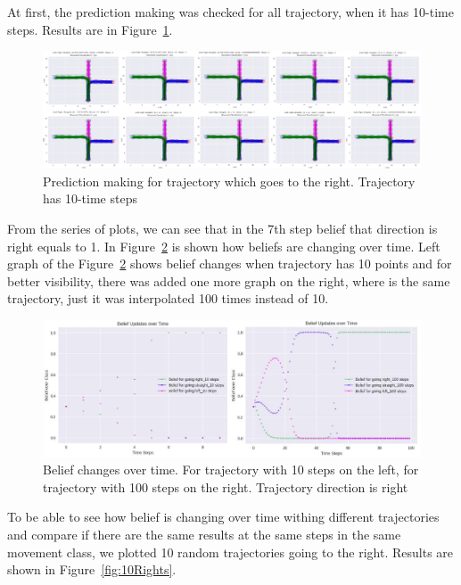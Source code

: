 At first, the prediction making was checked for all trajectory, when it has 10-time steps. Results are in Figure~\ref{fig:rightPrediction}. 

\begin{figure}[H]
	\centering  	
	\includegraphics[width=18cm]{img/0_prediction_right.PNG}
	\caption{Prediction making for trajectory which goes to the right. Trajectory has 10-time steps}
	\label{fig:rightPrediction}    
\end{figure}

From the series of plots, we can see that in the 7th step belief that direction is right equals to 1. In Figure~\ref{fig:CompareRight} is shown how beliefs are changing over time. Left graph of the Figure~\ref{fig:CompareRight} shows belief changes when trajectory has 10 points and for better visibility, there was added one more graph on the right, where is the same trajectory, just it was interpolated 100 times instead of 10.

\begin{figure}[H]
	\centering  	
	\includegraphics[width=15cm]{img/10_100_compared_right.jpg}
	\caption{Belief changes over time. For trajectory with 10 steps on the left, for trajectory with 100 steps on the right. Trajectory direction is right}
	\label{fig:CompareRight}    
\end{figure}

To be able to see how belief is changing over time withing different trajectories and compare if there are the same results at the same steps in the same movement class, we plotted 10 random trajectories going to the right. Results are shown in Figure~\ref{fig:10Rights}.

